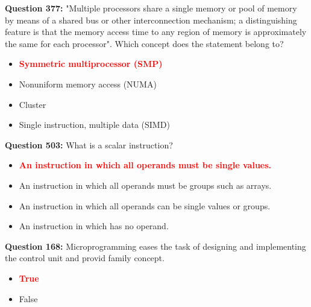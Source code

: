 \documentclass[12pt,a4paper]{article}
\begin{document}
\vspace{0.5cm}

\vspace{0.5cm}

\textbf{Question 377:} "Multiple processors share a single memory or pool of memory by means of a shared bus or other interconnection mechanism; a distinguishing feature is that the memory access time to any region of memory is approximately the same for each processor". Which concept does the statement belong to?

\begin{itemize}
    \item[\textbf{A.}] \textcolor{red}{\textbf{Symmetric multiprocessor (SMP)}}
    \item[\textbf{B.}] Nonuniform memory access (NUMA)
    \item[\textbf{C.}] Cluster
    \item[\textbf{D.}] Single instruction, multiple data (SIMD)
\end{itemize}

\vspace{0.5cm}

\vspace{0.5cm}

\textbf{Question 503:} What is a scalar instruction?

\begin{itemize}
    \item[\textbf{A.}] \textcolor{red}{\textbf{An instruction in which all operands must be single values.}}
    \item[\textbf{B.}] An instruction in which all operands must be groups such as arrays.
    \item[\textbf{C.}] An instruction in which all operands can be single values or groups.
    \item[\textbf{D.}] An instruction in which has no operand.
\end{itemize}

\vspace{0.5cm}

\vspace{0.5cm}

\textbf{Question 168:} Microprogramming eases the task of designing and implementing the control unit and provid family concept.

\begin{itemize}
    \item[\textbf{A.}] \textcolor{red}{\textbf{True}}
    \item[\textbf{B.}] False
\end{itemize}
\end{document}
